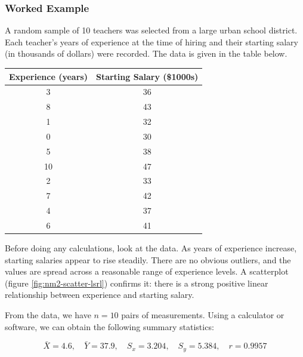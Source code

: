 \subsubsection{Worked Example}

A random sample of 10 teachers was selected from a large urban school district.
Each teacher's years of experience at the time of hiring and their starting salary
(in thousands of dollars) were recorded. The data is given in the table below.


\begin{center}
\begin{tabular}{|c|c|}
\hline
\textbf{Experience (years)} & \textbf{Starting Salary (\$1000s)} \\
\hline
3  & 36 \\
8  & 43 \\
1  & 32 \\
0  & 30 \\
5  & 38 \\
10 & 47 \\
2  & 33 \\
7  & 42 \\
4  & 37 \\
6  & 41 \\
\hline
\end{tabular}
\end{center}

Before doing any calculations, look at the data. As years of experience increase,
starting salaries appear to rise steadily. There are no obvious outliers, and the
values are spread across a reasonable range of experience levels. A scatterplot (figure \ref{fig:nm2-scatter-lsrl}) confirms it: there is a
strong positive linear relationship between experience and starting salary.

From the data, we have $n = 10$ pairs of measurements. Using a calculator or
software, we can obtain the following summary statistics:

\[
\bar{X} = 4.6, \quad \bar{Y} = 37.9, \quad S_x = 3.204, \quad S_y = 5.384,
\quad r = 0.9957
\]


